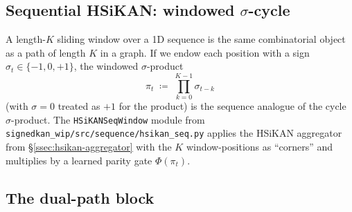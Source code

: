 \documentclass[11pt,a4paper]{article}
\theoremstyle{remark}
\begin{document}
\subsection{Sequential HSiKAN: windowed $\sigma$-cycle}

A length-$K$ sliding window over a 1D sequence is the same
combinatorial object as a path of length $K$ in a graph. If we
endow each position with a sign $\sigma_t \in \{-1, 0, +1\}$, the
windowed $\sigma$-product
\[
  \pi_t \;\coloneqq\; \prod_{k = 0}^{K - 1} \sigma_{t-k}
\]
(with $\sigma = 0$ treated as $+1$ for the product) is the
sequence analogue of the cycle $\sigma$-product. The
\texttt{HSiKANSeqWindow} module from
\texttt{signedkan\_wip/src/sequence/hsikan\_seq.py} applies the
HSiKAN aggregator from \S\ref{ssec:hsikan-aggregator} with the
$K$ window-positions as ``corners'' and multiplies by a learned
parity gate $\Phi(\pi_t)$.

\subsection{The dual-path block}
\end{document}
